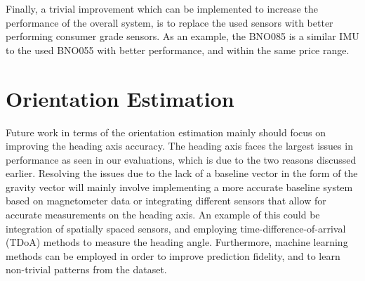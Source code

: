 Finally, a trivial improvement which can be implemented to increase the performance of the overall system, is to replace the used sensors with better performing consumer grade sensors. As an example, the BNO085 is a similar IMU to the used BNO055 with better performance, and within the same price range.


\section{Orientation Estimation}
Future work in terms of the orientation estimation mainly should focus on improving the heading axis accuracy. The heading axis faces the largest issues in performance as seen in our evaluations, which is due to the two reasons discussed earlier. Resolving the issues due to the lack of a baseline vector in the form of the gravity vector will mainly involve implementing a more accurate baseline system based on magnetometer data or integrating different sensors that allow for accurate measurements on the heading axis. An example of this could be integration of spatially spaced sensors, and employing time-difference-of-arrival (TDoA) methods to measure the heading angle. \cite{stanculeanu_2012_enhanced} Furthermore, machine learning methods can be employed in order to improve prediction fidelity, and to learn non-trivial patterns from the dataset. \cite{yan_2019_ronin}

